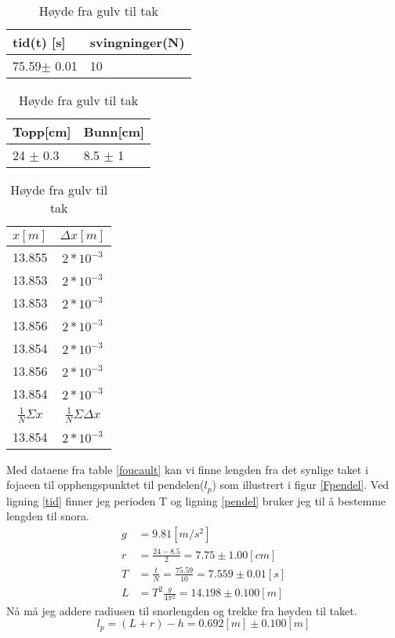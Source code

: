 \documentclass[norsk,a4paper,12pt]{article}
\begin{document}
\begin{table}
\caption{\textbf{Foucault pendelen}}
	\begin{minipage}{.5\linewidth}
	\centering
	\caption{Periode}
		\begin{tabular}{| l | l |}
		\hline
		tid(t) [s]& svingninger(N)\\ \hline
		75.59$\pm$ 0.01 & 10 \\ \hline
		\end{tabular}
	\end{minipage}
	\hspace{.5cm}
	\begin{minipage}{.5\linewidth}
	\centering
	\caption{Kule målt fra gulv}
		\begin{tabular}{| l | l |}
		\hline
		Topp[cm] & Bunn[cm]\\ \hline
		24 $\pm$ 0.3 & 8.5 $\pm$ 1 \\ \hline
		\end{tabular}
	\end{minipage}
	\hspace{.5cm}
	\begin{minipage}{.5\linewidth}
	\centering
	\caption{Høyde fra gulv til tak}
		\begin{tabular}{|c|c|}
		\hline
		$x[m]$ & $\Delta x[m]$ \\ 
		\hline
		13.855 & $2*10^{-3}$ \\
		13.853 & $2*10^{-3}$ \\
		13.853 & $2*10^{-3}$ \\
		13.856 & $2*10^{-3}$ \\
		13.854 & $2*10^{-3}$ \\
		13.856 & $2*10^{-3}$ \\
		13.854& $2*10^{-3}$ \\ \hline
		$\frac{1}{N}\Sigma x$ &$\frac{1}{N}\Sigma \Delta x$\\
		\hline
		13.854 & $2*10^{-3}$ \\
		\hline
		\end{tabular}
	\end{minipage}
	\hspace{.5cm}
\label{foucault}
\end{table}

Med dataene fra table \vref{foucault} kan vi finne lengden fra det synlige taket i fojaeen til opphengspunktet til pendelen($l_p$) som illustrert i figur \ref{Fpendel}. Ved ligning \ref{tid} finner jeg  perioden T og ligning \ref{pendel} bruker jeg til å bestemme lengden til snora.
\begin{align*}
g &= 9.81[m/s^2]\\
r & = \frac{24 - 8.5}{2} = 7.75 \pm 1.00 [cm] \\
T &= \frac{t}{N} = \frac{75.59}{10} = 7.559 \pm 0.01 [s] \\
L &= T^2\frac{g}{4\pi^2} = 14.198 \pm 0.100[m]
\end{align*}
Nå må jeg addere radiusen til snorlengden og trekke fra høyden til taket.
$$
l_p = (L+r)-h = 0.692[m] \pm 0.100 [m]
$$
\end{document}
